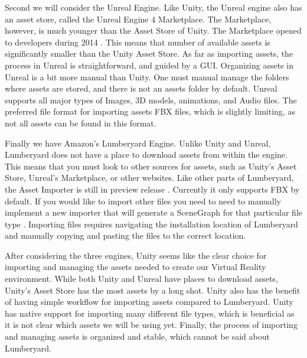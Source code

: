 \documentclass[10pt,journal,compsoc,onecolumn, draftclsnofoot]{IEEEtran}
\begin{document}
Second we will consider the Unreal Engine.
Like Unity, the Unreal engine also has an asset store, called the Unreal Engine 4 Marketplace.
The Marketplace, however, is much younger than the Asset Store of Unity.
The Marketplace opened to developers during 2014 \cite{unreal_marketplace_date}.
This means that number of available assets is significantly smaller than the Unity Asset Store.
As far as importing assets, the process in Unreal is straightforward, and guided by a GUI.
Organizing assets in Unreal is a bit more manual than Unity.
One must manual manage the folders where assets are stored, and there is not an assets folder by default.
Unreal supports all major types of Images, 3D models, animations, and Audio files.
The preferred file format for importing assets FBX files, which is slightly limiting, as not all assets can be found in this format.

Finally we have Amazon's Lumberyard Engine.
Unlike Unity and Unreal, Lumberyard does not have a place to download assets from within the engine.
This means that you must look to other sources for assets, such as Unity's Asset Store, Unreal's Marketplace, or other websites.
Like other parts of Lumberyard, the Asset Importer is still in preview release \cite{lumberyard_asset_import}.
Currently it only supports FBX by default.
If you would like to import other files you need to need to manually implement a new importer that will generate a SceneGraph for that particular file type \cite{lumberyard_asset_import}.
Importing files requires navigating the installation location of Lumberyard and manually copying and pasting the files to the correct location.

After considering the three engines, Unity seems like the clear choice for importing and managing the assets needed to create our Virtual Reality environment.
While both Unity and Unreal have places to download assets, Unity's Asset Store has the most assets by a long shot.
Unity also has the benefit of having simple workflow for importing assets compared to Lumberyard.
Unity has native support for importing many different file types, which is beneficial as it is not clear which assets we will be using yet.
Finally, the process of importing and managing assets is organized and stable, which cannot be said about Lumberyard.
\end{document}
